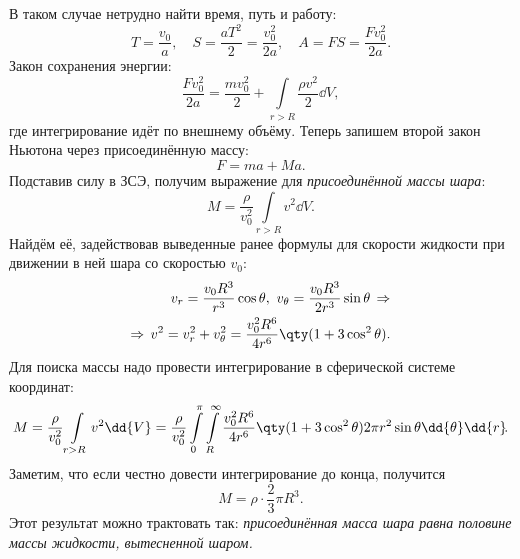 В таком случае нетрудно найти время, путь и работу:
\begin{equation}
    T=\frac{v_0}{a}, \quad S = \frac{aT^2}{2} = \frac{v_0^2}{2a}, \quad
    A = FS = \frac{Fv_0^2}{2a}.
\end{equation}
Закон сохранения энергии:
\begin{equation}
    \frac{Fv_0^2}{2a} = \frac{mv_0^2}{2} + \int\limits_{r>R} \frac{\rho v^2}{2} \dd{V}\!,
\end{equation}
где интегрирование идёт по внешнему объёму. Теперь запишем второй закон Ньютона через присоединённую массу:
\begin{equation}
    F= ma +Ma.
\end{equation}
Подставив силу в ЗСЭ,  получим выражение для \textit{присоединённой массы шара}:
\begin{equation}
    M  = \frac{\rho}{v_0^2} \int\limits_{r>R} v^2 \dd{V}\!.
\end{equation}
Найдём её, задействовав выведенные ранее формулы для скорости жидкости при движении в ней шара со скоростью $v_0$:
\begin{equation}
    \begin{aligned}
        v_r= \frac{v_0 R^3}{r^3}\cos\theta, \,\,
        v_\theta = \frac{v_0 R^3}{2r^3} \sin\theta
        \,\Rightarrow \\
        \Rightarrow \,
        v^2 = v_r^2 + v_\theta^2 = \frac{v_0^2 R^6}{4r^6}
            \qty(1+3\cos^2\theta).
    \end{aligned}
\end{equation}
Для поиска массы надо провести интегрирование в сферической системе координат:
\begin{equation}
    M= \frac{\rho}{v_0^2} \int\limits_{r>R} v^2 \dd{V}=
    \frac{\rho}{v_0^2} \int\limits_0^\pi \int\limits_R^\infty  \frac{v_0^2 R^6}{4r^6}
        \qty(1+3\cos^2\theta)
 2\pi r^2 \sin\theta \dd{\theta} \dd{r}\!.
\end{equation}
Заметим, что если честно довести интегрирование до конца, получится
\begin{equation}
    M = \rho \cdot \frac{2}{3} \pi R^3.
\end{equation}
Этот результат можно трактовать так: \textit{присоединённая масса шара равна половине массы жидкости, вытесненной шаром.}

